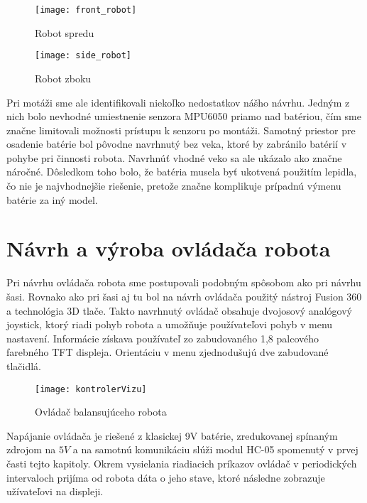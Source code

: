 \begin{figure}[h]
\centering
\begin{minipage}[b]{0.48\textwidth}
\centering
\texttt{[image: front\_robot]}
\caption{Robot spredu}
\label{fig:robot_front}
\end{minipage}\quad
\begin{minipage}[b]{0.48\textwidth}
\centering
\texttt{[image: side\_robot]}
\caption{Robot zboku}
\label{fig:robot_side}
\end{minipage}
\end{figure}

Pri motáži sme ale identifikovali niekoľko nedostatkov nášho návrhu. Jedným z nich bolo nevhodné umiestnenie senzora MPU6050 priamo nad batériou, čím sme značne limitovali možnosti prístupu k senzoru po montáži. Samotný priestor pre osadenie batérie bol pôvodne navrhnutý bez veka, ktoré by zabránilo batérií v pohybe pri činnosti robota. Navrhnúť vhodné veko sa ale ukázalo ako značne náročné. Dôsledkom toho bolo, že batéria musela byť ukotvená použitím lepidla, čo nie je najvhodnejšie riešenie, pretože značne komplikuje prípadnú výmenu batérie za iný model.    

\section{Návrh a výroba ovládača robota}

Pri návrhu ovládača robota sme postupovali podobným spôsobom ako pri návrhu šasi. Rovnako ako pri šasi aj tu bol na návrh ovládača použitý nástroj Fusion 360 a technológia 3D tlače. Takto navrhnutý ovládač obsahuje dvojosový analógový joystick, ktorý riadi pohyb robota a umožňuje používateľovi pohyb v menu nastavení. Informácie získava používateľ zo zabudovaného 1,8 palcového farebného TFT displeja. Orientáciu v menu zjednodušujú dve zabudované tlačidlá.

\begin{figure}[h]
\centering
\texttt{[image: kontrolerVizu]}
\caption{Ovládač balansujúceho robota}
\label{fig:kontrolerVizu}
\end{figure}

Napájanie ovládača je riešené z klasickej 9V batérie, zredukovanej spínaným zdrojom na $5V$ a na samotnú komunikáciu slúži modul HC-05 spomenutý v prvej časti tejto kapitoly. Okrem vysielania riadiacich príkazov ovládač v periodických intervaloch prijíma od robota dáta o jeho stave, ktoré následne zobrazuje užívateľovi na displeji.
 
